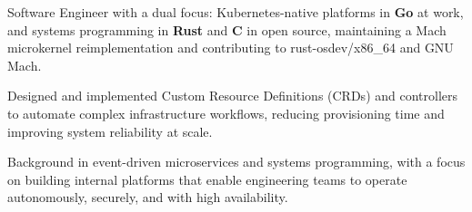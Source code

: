 
\begin{cvparagraph}

	Software Engineer with a dual focus: Kubernetes-native platforms in \textbf{Go} at
	work, and systems programming in \textbf{Rust} and \textbf{C} in open source, maintaining a Mach microkernel reimplementation and
	contributing to rust-osdev/x86\_64 and GNU Mach.

	Designed and implemented Custom Resource Definitions (CRDs) and controllers 
	to automate complex infrastructure workflows, reducing provisioning time and 
	improving system reliability at scale.

	Background in event-driven microservices and systems programming, with a focus 
	on building internal platforms that enable engineering teams to operate 
	autonomously, securely, and with high availability.
\end{cvparagraph}
